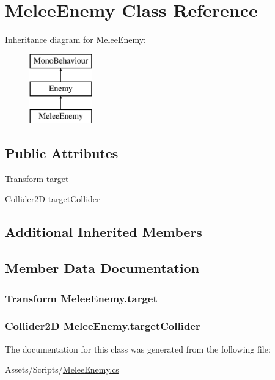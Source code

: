 \hypertarget{class_melee_enemy}{}\section{Melee\+Enemy Class Reference}
\label{class_melee_enemy}
Inheritance diagram for Melee\+Enemy\+:\begin{figure}[H]
\begin{center}
\leavevmode
\includegraphics[height=3.000000cm]{class_melee_enemy}
\end{center}
\end{figure}
\subsection*{Public Attributes}
\begin{DoxyCompactItemize}
\item 
Transform \hyperlink{class_melee_enemy_a291fd2cc23512ddb6e0854fd67f69ed7}{target}
\item 
Collider2\+D \hyperlink{class_melee_enemy_a45c0237268f52669ad259169a5e58e93}{target\+Collider}
\end{DoxyCompactItemize}
\subsection*{Additional Inherited Members}


\subsection{Member Data Documentation}
\hypertarget{class_melee_enemy_a291fd2cc23512ddb6e0854fd67f69ed7}{}
\subsubsection[{target}]{\setlength{\rightskip}{0pt plus 5cm}Transform Melee\+Enemy.\+target}\label{class_melee_enemy_a291fd2cc23512ddb6e0854fd67f69ed7}
\hypertarget{class_melee_enemy_a45c0237268f52669ad259169a5e58e93}{}
\subsubsection[{target\+Collider}]{\setlength{\rightskip}{0pt plus 5cm}Collider2\+D Melee\+Enemy.\+target\+Collider}\label{class_melee_enemy_a45c0237268f52669ad259169a5e58e93}


The documentation for this class was generated from the following file\+:\begin{DoxyCompactItemize}
\item 
Assets/\+Scripts/\hyperlink{_melee_enemy_8cs}{Melee\+Enemy.\+cs}\end{DoxyCompactItemize}
